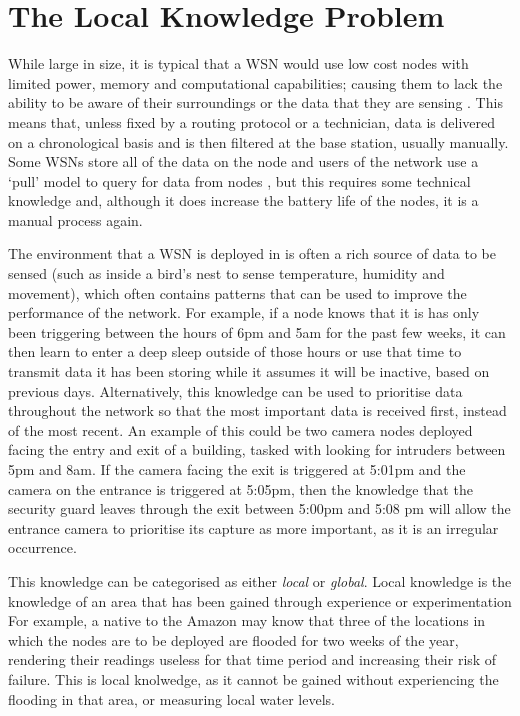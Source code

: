 \section{The Local Knowledge Problem}
While large in size, it is typical that a WSN would use low cost nodes with limited power, memory and computational capabilities; causing them to lack the ability to be aware of their surroundings or the data that they are sensing \cite{Akyildiz2002}. This means that, unless fixed by a routing protocol or a technician, data is delivered on a chronological basis and is then filtered at the base station, usually manually. Some WSNs store all of the data on the node and users of the network use a `pull' model to query for data from nodes \cite{Sadagopan}, but this requires some technical knowledge and, although it does increase the battery life of the nodes, it is a manual process again.

The environment that a WSN is deployed in is often a rich source of data to be sensed (such as inside a bird's nest to sense temperature, humidity and movement), which often contains patterns that can be used to improve the performance of the network. For example, if a node knows that it is has only been triggering between the hours of 6pm and 5am for the past few weeks, it can then learn to enter a deep sleep outside of those hours or use that time to transmit data it has been storing while it assumes it will be inactive, based on previous days. Alternatively, this knowledge can be used to prioritise data throughout the network so that the most important data is received first, instead of the most recent. An example of this could be two camera nodes deployed facing the entry and exit of a building, tasked with looking for intruders between 5pm and 8am. If the camera facing the exit is triggered at 5:01pm and the camera on the entrance is triggered at 5:05pm, then the knowledge that the security guard leaves through the exit between 5:00pm and 5:08 pm will allow the entrance camera to prioritise its capture as more important, as it is an irregular occurrence.

This knowledge can be categorised as either \textit{local} or \textit{global}. Local knowledge  is the knowledge of an area that has been gained through experience or experimentation \cite{Joshi2001} For example, a native to the Amazon may know that three of the locations in which the nodes are to be deployed are flooded for two weeks of the year, rendering their readings useless for that time period and increasing their risk of failure. This is local knolwedge, as it cannot be gained without experiencing the flooding in that area, or measuring local water levels.

